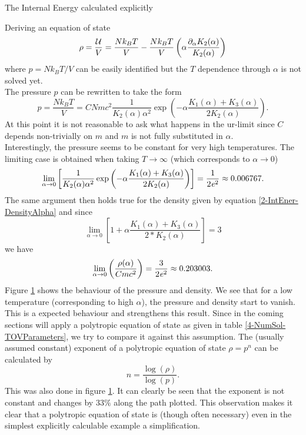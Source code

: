\begin{section}{The Internal Energy calculated explicitly}
\begin{subsection}{Deriving an equation of state}
\begin{equation}
	\rho = \frac{\mathcal{U}}{V} = \frac{Nk_BT}{V} - \frac{Nk_BT}{V}\left(\alpha\frac{\partial_\alpha K_2(\alpha)}{K_2(\alpha)}\right)
	\label{2-IntEner-DensityAlpha}
\end{equation}
where $p=Nk_BT/V$ can be easily identified but the $T$ dependence through $\alpha$ is not solved yet.\\
The pressure $p$ can be rewritten to take the form
\begin{equation}
	p = \frac{Nk_BT}{V} = CNmc^2\frac{1}{K_2(\alpha)\alpha^2}\exp\left(-\alpha\frac{K_1(\alpha)+K_3(\alpha)}{2K_2(\alpha)}\right).
	\label{2-IntEner-PressureAlpha}
\end{equation}
At this point it is not reasonable to ask what happens in the ur-limit since $C$ depends non-trivially on $m$ and $m$ is not fully substituted in $\alpha$.\\
Interestingly, the pressure seems to be constant for very high temperatures. The limiting case is obtained when taking $T\rightarrow\infty$ (which corresponds to $\alpha\rightarrow0$)
\begin{equation}
	\lim\limits_{\alpha\to0}\left[\frac{1}{K_2(\alpha)\alpha^2}\exp\left(-\alpha\frac{K_1(\alpha)+K_3(\alpha)}{2K_2(\alpha)}\right)\right] = \frac{1}{2\mathit{e}^2} \approx 0.006767.
\end{equation}
The same argument then holds true for the density given by equation \ref{2-IntEner-DensityAlpha} and since 
\begin{equation}
	\lim\limits_{\alpha\to0}\left[1+\alpha\frac{K_1(\alpha)+K_3(\alpha)}{2*K_2(\alpha)}\right] = 3
\end{equation}
we have
\begin{equation}
	\lim\limits_{\alpha\to0}\left(\frac{\rho(\alpha)}{Cmc^2}\right) = \frac{3}{2\mathit{e}^2} \approx 0.203003.
\end{equation}
Figure \ref{2-IntEner-PressureDensityPlot} shows the behaviour of the pressure and density. We see that for a low temperature (corresponding to high $\alpha$), the pressure and density start to vanish. This is a expected behaviour and strengthens this result. Since in the coming sections will apply a polytropic equation of state as given in table \ref{4-NumSol-TOVParameters}, we try to compare it against this assumption. The (usually assumed constant) exponent of a polytropic equation of state $\rho=p^n$ can be calculated by
\begin{equation}
	n = \frac{\log(\rho)}{\log(p)}.
\end{equation}
This was also done in figure \ref{2-IntEner-PressureDensityPlot}. It can clearly be seen that the exponent is not constant and changes by $33\%$ along the path plotted. This observation makes it clear that a polytropic equation of state is (though often necessary) even in the simplest explicitly calculable example a simplification.
\begin{figure}[H]
	\centering
	
	\caption[]{}
	\label{2-IntEner-PressureDensityPlot}
\end{figure}


\end{subsection}
\end{section}
